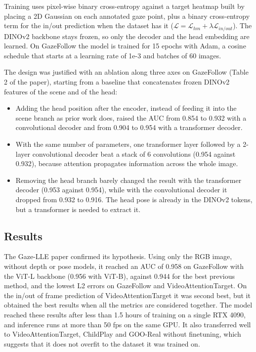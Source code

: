 \documentclass[12pt]{article}
\begin{document}
\vspace{0.5cm}

Training uses pixel-wise binary cross-entropy against a target heatmap built by placing a 2D Gaussian on each annotated gaze point, plus a binary cross-entropy term for the in/out prediction when the dataset has it (\(\mathcal{L} = \mathcal{L}_{hm} + \lambda \mathcal{L}_{in/out}\)).
The DINOv2 backbone stays frozen, so only the decoder and the head embedding are learned. On GazeFollow the model is trained for 15 epochs with Adam, a cosine schedule that starts at a learning rate of 1e-3 and batches of 60 images.

\vspace{0.5cm}

The design was justified with an ablation along three axes on GazeFollow (Table 2 of the paper), starting from a baseline that concatenates frozen DINOv2 features of the scene and of the head:
\begin{itemize}
    \item Adding the head position after the encoder, instead of feeding it into the scene branch as prior work does, raised the AUC from 0.854 to 0.932 with a convolutional decoder and from 0.904 to 0.954 with a transformer decoder.
    \item With the same number of parameters, one transformer layer followed by a 2-layer convolutional decoder beat a stack of 6 convolutions (0.954 against 0.932), because attention propagates information across the whole image.
    \item Removing the head branch barely changed the result with the transformer decoder (0.953 against 0.954), while with the convolutional decoder it dropped from 0.932 to 0.916. The head pose is already in the DINOv2 tokens, but a transformer is needed to extract it.
\end{itemize}

\vspace{0.5cm}

\subsection*{Results}

The Gaze-LLE paper confirmed its hypothesis. Using only the RGB image, without depth or pose models, it reached an AUC of 0.958 on GazeFollow with the ViT-L backbone (0.956 with ViT-B), against 0.944 for the best previous method, and the lowest L2 errors on GazeFollow and VideoAttentionTarget.
On the in/out of frame prediction of VideoAttentionTarget it was second best, but it obtained the best results when all the metrics are considered together. The model reached these results after less than 1.5 hours of training on a single RTX 4090, and inference runs at more than 50 fps on the same GPU.
It also transferred well to VideoAttentionTarget, ChildPlay and GOO-Real without finetuning, which suggests that it does not overfit to the dataset it was trained on.
\end{document}
